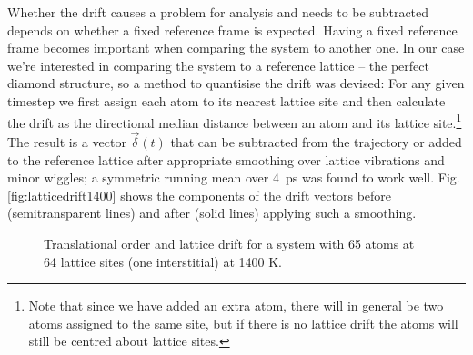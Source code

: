 \documentclass[11pt,bibliography=totoc,index=totoc]{scrbook}   %
\begin{document}
Whether the drift causes a problem for analysis and needs to be subtracted depends on whether a fixed reference frame is expected. 
Having a fixed reference frame becomes important when comparing the system to another one. 
In our case we're interested in comparing the system to a reference lattice – the perfect diamond structure, so a method to quantisise the drift was devised:
For any given timestep we first assign each atom to its nearest lattice site and then calculate the drift as the directional median distance between an atom and its lattice site.\footnote{Note that since we have added an extra atom, there will in general be two atoms assigned to the same site, but if there is no lattice drift the atoms will still be centred about lattice sites.}
The result is a vector $\vec{\delta}(t)$ that can be subtracted from the trajectory or added to the reference lattice after appropriate smoothing over lattice vibrations and minor wiggles; a symmetric running mean over 4~ps was found to work well.
Fig. \ref{fig:latticedrift1400} shows the components of the drift vectors before (semitransparent lines) and after (solid lines) applying such a smoothing.

\begin{figure}[htbp]
  \centering
  \caption{Translational order and lattice drift for a system with 65 atoms at 64 lattice sites (one interstitial) at 1400 K.}
  \label{fig:translationalorder}
\end{figure}




\end{document}
